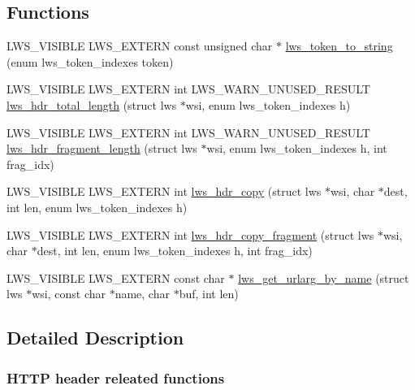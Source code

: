 \subsection*{Functions}
\begin{DoxyCompactItemize}
\item 
L\+W\+S\+\_\+\+V\+I\+S\+I\+B\+LE L\+W\+S\+\_\+\+E\+X\+T\+E\+RN const unsigned char $\ast$ \hyperlink{group__HTTP-headers-read_ga2c0597b2ef1d2cee35736c338bcbd17b}{lws\+\_\+token\+\_\+to\+\_\+string} (enum lws\+\_\+token\+\_\+indexes token)
\item 
L\+W\+S\+\_\+\+V\+I\+S\+I\+B\+LE L\+W\+S\+\_\+\+E\+X\+T\+E\+RN int L\+W\+S\+\_\+\+W\+A\+R\+N\+\_\+\+U\+N\+U\+S\+E\+D\+\_\+\+R\+E\+S\+U\+LT \hyperlink{group__HTTP-headers-read_ga8ade0e1ffb0da7e62b989d8d867bf6c8}{lws\+\_\+hdr\+\_\+total\+\_\+length} (struct lws $\ast$wsi, enum lws\+\_\+token\+\_\+indexes h)
\item 
L\+W\+S\+\_\+\+V\+I\+S\+I\+B\+LE L\+W\+S\+\_\+\+E\+X\+T\+E\+RN int L\+W\+S\+\_\+\+W\+A\+R\+N\+\_\+\+U\+N\+U\+S\+E\+D\+\_\+\+R\+E\+S\+U\+LT \hyperlink{group__HTTP-headers-read_ga594f3d0ece5b09c2ccf9f98ea533bb4e}{lws\+\_\+hdr\+\_\+fragment\+\_\+length} (struct lws $\ast$wsi, enum lws\+\_\+token\+\_\+indexes h, int frag\+\_\+idx)
\item 
L\+W\+S\+\_\+\+V\+I\+S\+I\+B\+LE L\+W\+S\+\_\+\+E\+X\+T\+E\+RN int \hyperlink{group__HTTP-headers-read_ga6ce6aa1c0155ea42b7708bed271d1c77}{lws\+\_\+hdr\+\_\+copy} (struct lws $\ast$wsi, char $\ast$dest, int len, enum lws\+\_\+token\+\_\+indexes h)
\item 
L\+W\+S\+\_\+\+V\+I\+S\+I\+B\+LE L\+W\+S\+\_\+\+E\+X\+T\+E\+RN int \hyperlink{group__HTTP-headers-read_gaa427cad61a9a5e3004afd65c4527b5e9}{lws\+\_\+hdr\+\_\+copy\+\_\+fragment} (struct lws $\ast$wsi, char $\ast$dest, int len, enum lws\+\_\+token\+\_\+indexes h, int frag\+\_\+idx)
\item 
L\+W\+S\+\_\+\+V\+I\+S\+I\+B\+LE L\+W\+S\+\_\+\+E\+X\+T\+E\+RN const char $\ast$ \hyperlink{group__HTTP-headers-read_ga84e9ce5e71a77501a0998ac403a984c2}{lws\+\_\+get\+\_\+urlarg\+\_\+by\+\_\+name} (struct lws $\ast$wsi, const char $\ast$name, char $\ast$buf, int len)
\end{DoxyCompactItemize}


\subsection{Detailed Description}
\subsubsection*{H\+T\+TP header releated functions}

